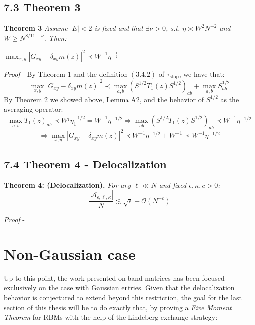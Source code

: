 \documentclass[11pt]{article}
\newenvironment{boxtheorem}[1]
  {\begin{mdframed}\noindent\textbf{#1}\itshape\space}
  {\end{mdframed}}
\newcommand{\sto}{\text{stop}}
\begin{document}
\subsection*{7.3 Theorem 3}
\label{proof-deloc}
\begin{boxtheorem}{Theorem 3}
\noindent Assume $|E|<2$ is fixed and that $\exists \nu>0$, s.t. $\eta \asymp W^2 N^{-2}$ and $W\geq N^{8/11+\nu}$. Then:
\begin{center}$\max_{x, y}|G_{xy} - \delta_{xy}m(z)|^2\prec W^{-1}\eta^{-\frac{1}{2}}$\end{center}
\end{boxtheorem}
\textit{Proof} - By Theorem 1 and the definition $(3.4.2)$ of $\tau_\sto$, we have that: $$\max_{x, y}|G_{xy} - \delta_{xy}m(z)|^2\prec \max_{a, b}(S^{1/2}T_1(z)S^{1/2})_{ab}+\max_{a, b}S_{ab}^{1/2}$$
By Theorem 2 we showed above, \hyperref[lemma-a2]{Lemma A2}, and the behavior of $S^{1/2}$ as the averaging operator: $$\max_{a, b}T_1(z)_{ab}\prec W^{_1}\eta_1^{-1/2} = W^{-1}\eta^{-1/2}\Rightarrow \max_{ab}\left(S^{1/2}T_1(z)S^{1/2}\right)_{ab}\prec W^{-1}\eta^{-1/2}$$
$$\Rightarrow \max_{x, y}|G_{xy} - \delta_{xy}m(z)|^2\prec  W^{-1}\eta^{-1/2}+W^{-1}\prec  W^{-1}\eta^{-1/2}$$
\newpage
\subsection*{7.4 Theorem 4 - Delocalization}
\begin{boxtheorem}{Theorem 4: (Delocalization).}
For any $\ell\ll N$ and fixed $\epsilon, \kappa, c>0$: $$\frac{|\mathcal{A}_{\epsilon, \ell, \kappa}|}{N}\lesssim \sqrt{\epsilon}+\mathcal{O}(N^{-c})$$
\end{boxtheorem}
\textit{Proof} - 



\newpage

\section{Non-Gaussian case}
\label{sec:non-gaussian}
Up to this point, the work presented on band matrices has been focused exclusively on the case with Gaussian entries. Given that the delocalization behavior is conjectured to extend beyond this restriction, the goal for the last section of this thesis will be to do exactly that, by proving a \textit{Five Moment Theorem} for RBMs with the help of the Lindeberg exchange strategy:
\end{document}
